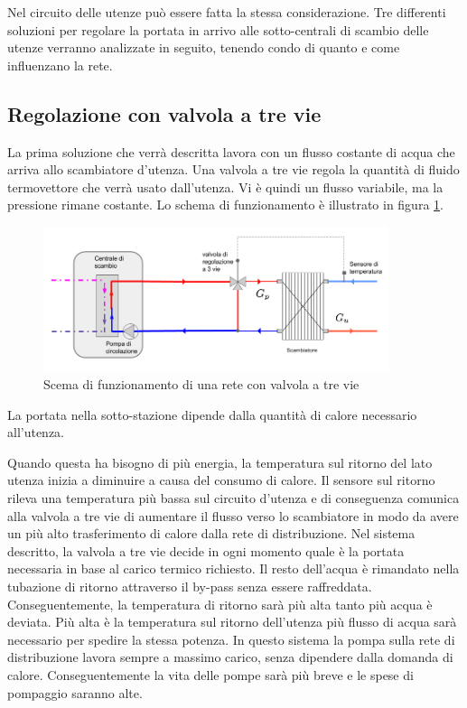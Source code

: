 \documentclass[laurea,oneside,11pt]{USiena_tesiLM}
\begin{document}
Nel circuito delle utenze può essere fatta la stessa considerazione. Tre differenti soluzioni per regolare la portata in arrivo alle sotto-centrali di scambio delle utenze verranno analizzate in seguito, tenendo condo di quanto e come influenzano la rete.

\subsection{Regolazione con valvola a tre vie}
La prima soluzione che verrà descritta lavora con un flusso costante di acqua che arriva allo scambiatore d'utenza. Una valvola a tre vie regola la quantità di fluido termovettore che verrà usato dall'utenza. Vi è quindi un flusso variabile, ma la pressione rimane costante. Lo schema di funzionamento è illustrato in figura \ref{fig:3vie}.

\begin{figure}[!ht]
\centering
\includegraphics[width=0.9\textwidth]{figure/3vie}
\caption{Scema di funzionamento di una rete con valvola a tre vie}
\label{fig:3vie}

\end{figure}


La portata nella sotto-stazione dipende dalla quantità di calore necessario all'utenza. 

Quando questa ha bisogno di più energia, la temperatura sul ritorno del lato utenza inizia a diminuire a causa del consumo di calore. Il sensore sul ritorno rileva una temperatura più bassa sul circuito d'utenza e di conseguenza comunica alla valvola a tre vie di aumentare il flusso verso lo scambiatore in modo da avere un più alto trasferimento di calore dalla rete di distribuzione.
Nel sistema descritto, la valvola a tre vie decide in ogni momento quale è la portata necessaria in base al carico termico richiesto. Il resto dell'acqua è rimandato nella tubazione di ritorno attraverso il by-pass senza essere raffreddata. Conseguentemente, la temperatura di ritorno sarà più alta tanto più acqua è deviata. Più alta è la temperatura sul ritorno dell'utenza     più flusso di acqua sarà necessario per spedire la stessa potenza. In questo sistema la pompa sulla rete di distribuzione lavora sempre a massimo carico, senza dipendere dalla domanda di calore. Conseguentemente la vita delle pompe sarà più breve e le spese di pompaggio saranno alte.
\end{document}
